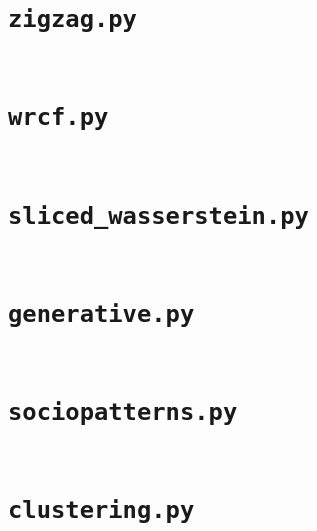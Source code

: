 \documentclass[a4paper,11pt,openany,extrafontsizes]{memoir}
\begin{document}
\section{\texttt{zigzag.py}}%
\label{sec:zigzagpy}

\inputminted{python}{zigzag.py}

\section{\texttt{wrcf.py}}%
\label{sec:wrcfpy}

\inputminted{python}{wrcf.py}

\section{\texttt{sliced\_wasserstein.py}}%
\label{sec:sliced_wassersteinpy}

\inputminted{python}{sliced_wasserstein.py}

\section{\texttt{generative.py}}%
\label{sec:generativepy}

\inputminted{python}{generative.py}

\section{\texttt{sociopatterns.py}}%
\label{sec:sociopatternspy}

\inputminted{python}{sociopatterns.py}

\section{\texttt{clustering.py}}%
\label{sec:clusteringpy}

\inputminted{python}{clustering.py}

\backmatter%

\printbibliography%
\end{document}
